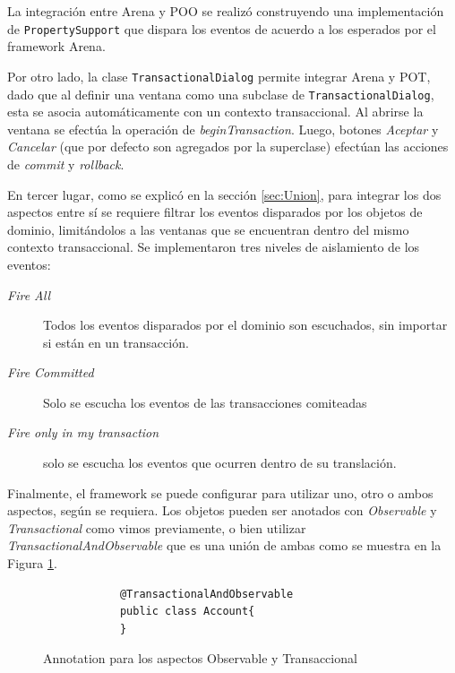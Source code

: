 La integración entre Arena y POO se realizó construyendo una implementación de
\lstinline|PropertySupport| que dispara los eventos de acuerdo a los esperados
por el framework Arena.

\medskip
Por otro lado, la clase \lstinline|TransactionalDialog| permite integrar Arena y
POT, dado que al definir una ventana como una subclase de
\lstinline|TransactionalDialog|, esta se asocia automáticamente con un
contexto transaccional.
Al abrirse la ventana se efectúa la operación de \emph{beginTransaction}.
Luego, botones \emph{Aceptar} y \emph{Cancelar} (que por defecto son agregados
por la superclase) efectúan las acciones de \emph{commit} y
\emph{rollback}.

\medskip
En tercer lugar, como se explicó en la sección \ref{sec:Union}, para integrar
los dos aspectos entre sí se requiere filtrar los eventos disparados por los objetos de dominio, 
limitándolos a las ventanas que se encuentran dentro del mismo contexto
transaccional. 
Se implementaron tres niveles de aislamiento de los eventos:
\begin{description}
	\item[\emph{Fire All}] Todos los eventos disparados por el dominio son
	escuchados, sin importar si están en un transacción.

	\item[\emph{Fire Committed}] Solo se escucha los eventos de las transacciones
		comiteadas
	
	\item[\emph{Fire only in my transaction}] solo se escucha los eventos que
		ocurren dentro de su translación.
 \end{description}
 
\medskip
Finalmente, el framework se puede configurar para utilizar uno, otro o ambos
aspectos, según se requiera.
Los objetos pueden ser anotados con \emph{Observable} y
\emph{Transactional} como vimos previamente, 
o bien utilizar \emph{TransactionalAndObservable} que es una unión de ambas como se muestra en la Figura \ref{taov}.

	\begin{figure}[hbt]
		\begin{lstlisting} 
			@TransactionalAndObservable
			public class Account{
			}
		\end{lstlisting}
		\caption{Annotation para los aspectos Observable y Transaccional}
		\label{taov}
	\end{figure}


